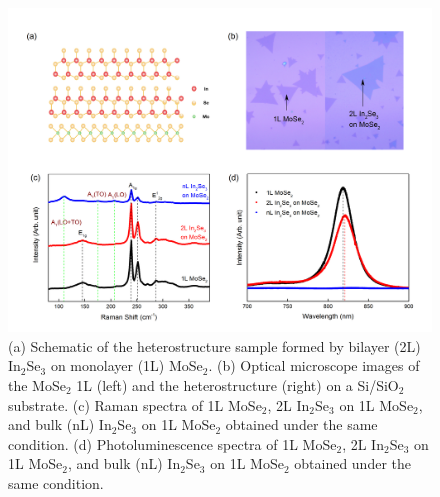 \documentclass[journal=jacsat,manuscript=article]{achemso}
\begin{document}
\begin{figure}
  \centering
  \includegraphics[width=14cm]{sample.jpg}
  \caption{(a) Schematic of the heterostructure sample formed by bilayer (2L) In$_2$Se$_3$ on monolayer (1L) MoSe$_2$. (b) Optical microscope images of the MoSe$_2$ 1L (left) and the heterostructure (right) on a Si/SiO$_2$ substrate. (c) Raman spectra of 1L MoSe$_2$, 2L In$_2$Se$_3$ on 1L MoSe$_2$, and bulk (nL) In$_2$Se$_3$ on 1L MoSe$_2$ obtained under the same condition. (d) Photoluminescence spectra of 1L MoSe$_2$, 2L In$_2$Se$_3$ on 1L MoSe$_2$, and bulk (nL) In$_2$Se$_3$ on 1L MoSe$_2$  obtained under the same condition.}
    \label{fig:sample}
\end{figure}
\end{document}

